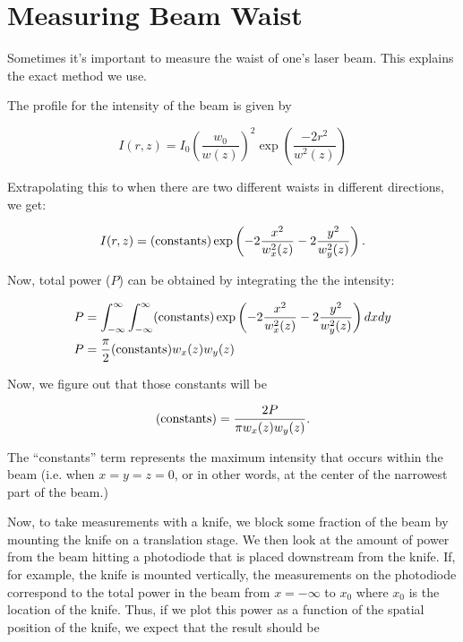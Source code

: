 \chapter{Measuring Beam Waist}
\label{BeamWaistAppendix}

Sometimes it's important to measure the waist of one's laser beam. This explains the exact method we use. 
  
The profile for the intensity of the beam is given by

\begin{equation} \label{electricFieldExplicitForm}
I(r,z)=I_0\left(\frac{w_0}{w(z)}\right)^2 \exp \left(\frac{-2 r^2}{w^2(z)}\right)
\end{equation}

Extrapolating this to when there are two different waists in different directions, we get: 

\begin{equation}
I(r,z)= ({\rm constants})\exp \left(-2\frac{x^2}{w_x^2(z)}-2\frac{y^2}{w_y^2(z)}\right) . 
\end{equation}

Now, total power ($P$) can be obtained by integrating the the intensity: 

\begin{align}
P&=\int_{-\infty}^{\infty}\int_{-\infty}^{\infty} ({\rm constants}) \exp \left(-2\frac{x^2}{w_x^2(z)}-2\frac{y^2}{w_y^2(z)}\right) dx dy\\
P&=\frac{\pi}{2} ({\rm constants}) w_x(z) w_y(z)
\end{align}

Now, we figure out that those constants will be

\begin{equation}
({\rm constants})=\frac{2 P}{\pi w_x(z) w_y(z)}.
\end{equation}

The ``constants'' term represents the maximum intensity that occurs within the beam (i.e. when $x=y=z=0$, or in other words, at the center of the narrowest part of the beam.)

Now, to take measurements with a knife, we block some fraction of the beam by mounting the knife on a translation stage. We then look at the amount of power from the beam hitting a photodiode that is placed downstream from the knife. If, for example, the knife is mounted vertically, the measurements on the photodiode correspond to the total power in the beam from $x=-\infty$ to $x_0$ where $x_0$ is the location of the knife. Thus, if we plot this power as a function of the spatial position of the knife, we expect that the result should be 

